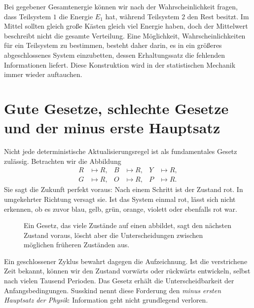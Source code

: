 Bei gegebener Gesamtenergie können wir nach der Wahrscheinlichkeit fragen, dass Teilsystem \(1\) die Energie \(E_1\) hat, während Teilsystem \(2\) den Rest besitzt. Im Mittel sollten gleich große Kästen gleich viel Energie haben, doch der Mittelwert beschreibt nicht die gesamte Verteilung. Eine Möglichkeit, Wahrscheinlichkeiten für ein Teilsystem zu bestimmen, besteht daher darin, es in ein größeres abgeschlossenes System einzubetten, dessen Erhaltungssatz die fehlenden Informationen liefert. Diese Konstruktion wird in der statistischen Mechanik immer wieder auftauchen.

\section{Gute Gesetze, schlechte Gesetze und der minus erste Hauptsatz}

Nicht jede deterministische Aktualisierungsregel ist als fundamentales Gesetz zulässig. Betrachten wir die Abbildung
\begin{equation}
 \begin{aligned}
 R&\mapsto R,& B&\mapsto R,& Y&\mapsto R,\\
 G&\mapsto R,& O&\mapsto R,& P&\mapsto R.
 \end{aligned}
 \label{eq:sm1-all-to-red}
\end{equation}
Sie sagt die Zukunft perfekt voraus: Nach einem Schritt ist der Zustand rot. In umgekehrter Richtung versagt sie. Ist das System einmal rot, lässt sich nicht erkennen, ob es zuvor blau, gelb, grün, orange, violett oder ebenfalls rot war.

\begin{figure}[htbp]\centering
{}\caption{Ein Gesetz, das viele Zustände auf einen abbildet, sagt den nächsten Zustand voraus, löscht aber die Unterscheidungen zwischen möglichen früheren Zuständen aus.}\label{fig:sm1-bad-law}\end{figure}

Ein geschlossener Zyklus bewahrt dagegen die Aufzeichnung. Ist die verstrichene Zeit bekannt, können wir den Zustand vorwärts oder rückwärts entwickeln, selbst nach vielen Tausend Perioden. Das Gesetz erhält die Unterscheidbarkeit der Anfangsbedingungen. Susskind nennt diese Forderung den \emph{minus ersten Hauptsatz der Physik}: Information geht nicht grundlegend verloren.

